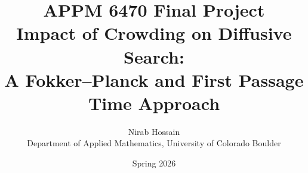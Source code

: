 \documentclass[11pt]{article}
\begin{document}
\title{\textbf{APPM 6470 Final Project}\\[4pt]
\large Impact of Crowding on Diffusive Search:\\
A Fokker--Planck and First Passage Time Approach}
\author{Nirab Hossain\\[2pt]\small Department of Applied Mathematics, University of Colorado Boulder}
\date{Spring 2026}

\maketitle

\begin{abstract}
  
\end{abstract}













\end{document}
